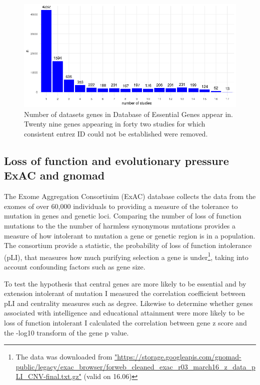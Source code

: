 \begin{figure}
    \centering
    \includegraphics[width=\textwidth]{images/chapter3/ggplot2/essential_genes/Rplot_num_studies_in_DEG_corrected.png}
    \caption{Number of datasets genes in Database of Essential Genes appear in. Twenty nine genes appearing in forty two studies for which consistent entrez ID could not be established were removed. }
    \label{fig:num_studies_database_essential_genes}
\end{figure}
\subsection{Loss of function and evolutionary pressure ExAC and gnomad}
\label{sec:methods exac and gnomad}
The Exome Aggregation Consortiuim (ExAC) database collects the data from the exomes of over 60,000 individuals to providing a measure of the tolerance to mutation in genes and genetic loci\cite{lek2016analysis}. Comparing the number of loss of function mutations to the the number of harmless synonymous mutations provides a measure of how intolerant to mutation a gene or genetic region is in a population. The consortium provide a statistic, the probability of loss of function intolerance (pLI), that measures how much purifying selection a gene is under\footnote{The data was downloaded from \url{"https://storage.googleapis.com/gnomad-public/legacy/exac_browser/forweb_cleaned_exac_r03_march16_z_data_pLI_CNV-final.txt.gz"} (valid on 16.06)}, taking into account confounding factors such as gene size. 

To test the hypothesis that central genes are more likely to be essential and by extension intolerant of mutation I measured the correlation coefficient between pLI and centrality measures such as degree. Likewise to determine whether genes associated with intelligence and educational attainment were more likely to be loss of function intolerant I calculated the correlation between gene z score and the -log10 transform of the gene p value. 

